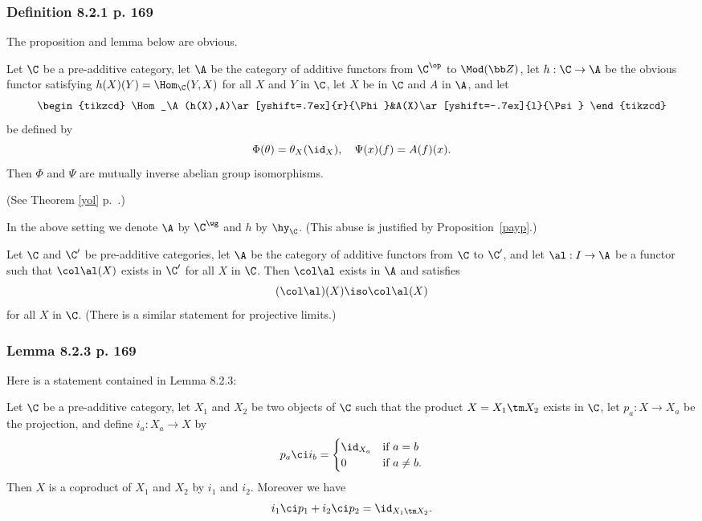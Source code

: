 \documentclass[12pt]{article}
\theoremstyle{remark}
\theoremstyle{definition}
\begin{document}
\subsubsection{Definition 8.2.1 p. 169}

The proposition and lemma below are obvious. 

\begin{prop} 
Let $\C$ be a pre-additive category, let $\A$ be the category of additive functors from $\C^{\op}$ to $\Mod(\bb Z)$, let $h:\C\to\A$ be the obvious functor satisfying $h(X)(Y)=\Hom_\C(Y,X)$ for all $X$ and $Y$ in $\C$, let $X$ be in $\C$ and $A$ in $\A$, and let 
$$
\begin{tikzcd}
\Hom_\A(h(X),A)\ar[yshift=.7ex]{r}{\Phi}&A(X)\ar[yshift=-.7ex]{l}{\Psi}
\end{tikzcd}
$$
be defined by 
$$
\Phi(\theta)=\theta_X(\id_X),\quad\Psi(x)(f)=A(f)(x).
$$
Then $\Phi$ and $\Psi$ are mutually inverse abelian group isomorphisms.
\end{prop} 

\nn(See Theorem \ref{yol} p.~.)

\begin{conv}
In the above setting we denote $\A$ by $\C^\wg$ and $h$ by $\hy_\C$. (This abuse is justified by Proposition~\ref{payp}.) 
\end{conv} 

\begin{lem} 
Let $\C$ and $\C'$ be pre-additive categories, let $\A$ be the category of additive functors from $\C$ to $\C'$, and let $\al:I\to\A$ be a functor such that $\col\al(X)$ exists in $\C'$ for all $X$ in $\C$. Then $\col\al$ exists in $\A$ and satisfies 
$$
(\col\al)(X)\iso\col\al(X)
$$ 
for all $X$ in $\C$. (There is a similar statement for projective limits.)
\end{lem} 


\subsubsection{Lemma 8.2.3 p. 169} 

Here is a statement contained in Lemma 8.2.3: 

\begin{cor} 
Let $\C$ be a pre-additive category, let $X_1$ and $X_2$ be two objects of $\C$ such that the product $X=X_1\tm X_2$ exists in $\C$, let $p_a:X\to X_a$ be the projection, and define $i_a:X_a\to X$ by 
$$
p_a\ci i_b=\begin{cases}\id_{X_a}&\text{if }a=b\\0&\text{if }a\not=b.\end{cases}
$$ 
Then $X$ is a coproduct of $X_1$ and $X_2$ by $i_1$ and $i_2$. Moreover we have 
$$
i_1\ci p_1+i_2\ci p_2=\id_{X_1\tm X_2}.
$$
\end{cor}
\end{document}
